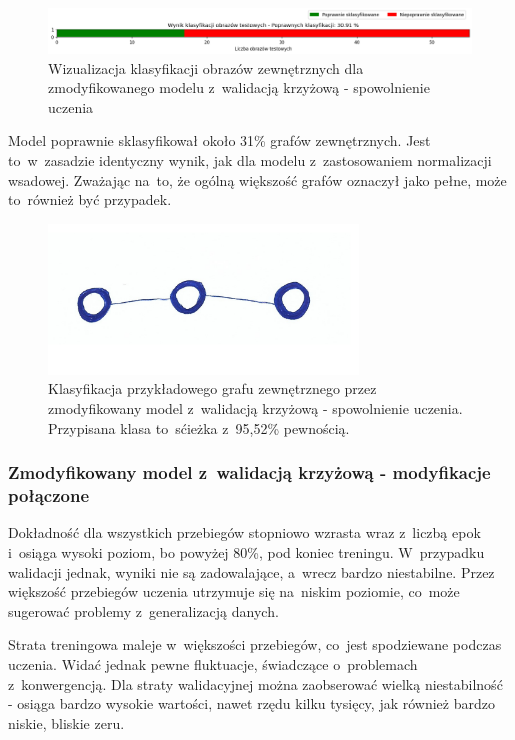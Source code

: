 \begin{figure}[ht]
	\centering
	\includegraphics[width=15.5cm]{resources/tests/images/v4/crossvalid_4_bar.png}
	\caption{Wizualizacja klasyfikacji obrazów zewnętrznych dla zmodyfikowanego modelu z~walidacją krzyżową - spowolnienie uczenia}
	\label{Fig:tests-cv-4c}
\end{figure}
\FloatBarrier

Model poprawnie sklasyfikował około 31\% grafów zewnętrznych.
Jest to~w~zasadzie identyczny wynik, jak dla modelu z~zastosowaniem normalizacji wsadowej.
Zważając na~to, że ogólną większość grafów oznaczył jako pełne, może to~również być przypadek.

\begin{figure}[ht]
	\centering
	\includegraphics[height=4cm]{../graph_classification/test_graphs/drawn/path-10.png}
	\caption{Klasyfikacja przykładowego grafu zewnętrznego przez zmodyfikowany model z~walidacją krzyżową - spowolnienie uczenia.
		Przypisana klasa to~sćieżka z~95,52\% pewnością.}
	\label{Fig:tests-cv-4d}
\end{figure}
\FloatBarrier

\subsubsection{Zmodyfikowany model z~walidacją krzyżową - modyfikacje połączone}

Dokładność dla wszystkich przebiegów stopniowo wzrasta wraz z~liczbą epok
i~osiąga wysoki poziom, bo powyżej 80\%, pod koniec treningu.
W~przypadku walidacji jednak, wyniki nie są zadowalające, a~wrecz bardzo niestabilne.
Przez większość przebiegów uczenia utrzymuje się na~niskim poziomie,
co~może sugerować problemy z~generalizacją danych.

Strata treningowa maleje w~większości przebiegów, co~jest spodziewane podczas uczenia.
Widać jednak pewne fluktuacje, świadczące o~problemach z~konwergencją.
Dla straty walidacyjnej można zaobserować wielką niestabilność - osiąga bardzo wysokie wartości,
nawet rzędu kilku tysięcy, jak również bardzo niskie, bliskie zeru.

